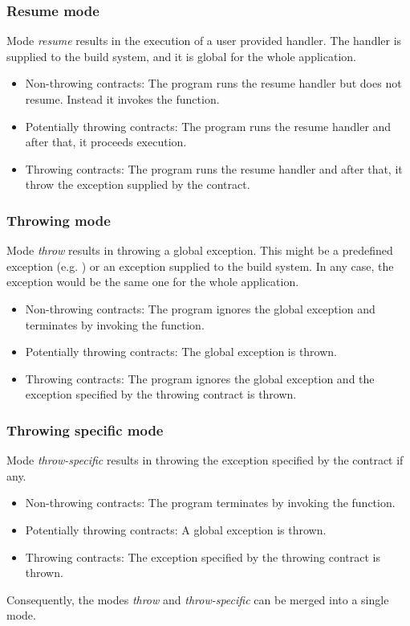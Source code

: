 \subsubsection{Resume mode}

Mode \emph{resume} results in the execution of a user provided handler. The
handler is supplied to the build system, and it is global for the whole
application.

\begin{itemize}
  \item Non-throwing contracts: The program runs the resume handler but does not
resume. Instead it invokes the  function.
  \item Potentially throwing contracts: The program runs the resume handler and
after that, it proceeds execution.
  \item Throwing contracts: The program runs the resume handler and after that,
it throw the exception supplied by the contract.
\end{itemize}

\subsubsection{Throwing mode}

Mode \emph{throw} results in throwing a global exception. This might be a
predefined exception (e.g. ) or an exception supplied to
the build system. In any case, the exception would be the same one for the whole
application.

\begin{itemize}
  \item Non-throwing contracts: The program ignores the global exception and
terminates by invoking the  function.
  \item Potentially throwing contracts: The global exception is thrown.
  \item Throwing contracts: The program ignores the global exception and the
exception specified by the throwing contract is thrown.
\end{itemize}

\subsubsection{Throwing specific mode}

Mode \emph{throw-specific} results in throwing the exception specified by the
contract if any.

\begin{itemize}
  \item Non-throwing contracts: The program 
terminates by invoking the  function.
  \item Potentially throwing contracts: A global exception is thrown.
  \item Throwing contracts: The 
exception specified by the throwing contract is thrown.
\end{itemize}

Consequently, the modes \emph{throw} and \emph{throw-specific} can be merged
into a single mode.
